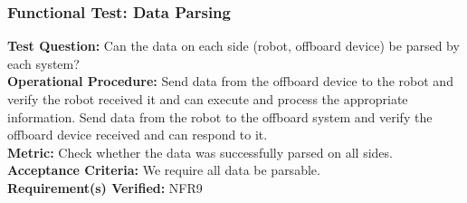 \subsubsection{Functional Test: Data Parsing}
\label{test:comm_ft_parse}
\textbf{Test Question:}  Can the data on each side (robot, offboard device) be parsed by each system? \\
\textbf{Operational Procedure:} Send data from the offboard device to the robot and verify the robot received it and can execute and process the appropriate information. Send data from the robot to the offboard system and verify the offboard device received and can respond to it. \\
\textbf{Metric:} Check whether the data was successfully parsed on all sides. \\
\textbf{Acceptance Criteria:} We require all data be parsable. \\
\textbf{Requirement(s) Verified:} NFR9 \\
